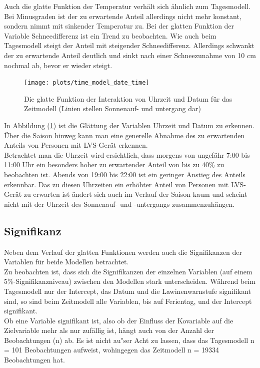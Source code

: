 \documentclass[12pt]{scrreprt}
\begin{document}
Auch die glatte Funktion der Temperatur verhält sich ähnlich zum Tagesmodell. Bei Minusgraden ist der zu erwartende Anteil allerdings nicht mehr konstant, sondern nimmt mit sinkender Temperatur zu. Bei der glatten Funktion der Variable Schneedifferenz ist ein Trend zu beobachten. Wie auch beim Tagesmodell steigt der Anteil mit steigender Schneedifferenz. Allerdings schwankt der zu erwartende Anteil deutlich und sinkt nach einer Schneezunahme von 10 cm nochmal ab, bevor er wieder steigt.
\begin{figure}[H]
	\centering
	\texttt{[image: plots/time\_model\_date\_time]}
	\caption{Die glatte Funktion der Interaktion von Uhrzeit und Datum für das Zeitmodell (Linien stellen Sonnenauf- und untergang dar)}
	\label{pic:time_model_date_time}	
\end{figure}
\noindent In Abbildung (\ref{pic:time_model_date_time}) ist die Glättung der Variablen Uhrzeit und Datum zu erkennen. Über die Saison hinweg kann man eine generelle Abnahme des zu erwartenden Anteils von Personen mit LVS-Gerät erkennen. \\
Betrachtet man die Uhrzeit wird ersichtlich, dass morgens von ungefähr 7:00 bis 11:00 Uhr ein besonders hoher zu erwartender Anteil von bis zu 40\% zu beobachten ist. Abends von 19:00 bis 22:00 ist ein geringer Anstieg des Anteils erkennbar. Das zu diesen Uhrzeiten ein erhöhter Anteil von Personen mit LVS-Gerät zu erwarten ist ändert sich auch im Verlauf der Saison kaum und scheint nicht mit der Uhrzeit des Sonnenauf- und -untergangs zusammenzuhängen.

\subsection{Signifikanz}
Neben dem Verlauf der glatten Funktionen werden auch die Signifikanzen der Variablen für beide Modellen betrachtet. \\
Zu beobachten ist, dass sich die Signifikanzen der einzelnen Variablen (auf einem 5\%-Signifikanzniveau) zwischen den Modellen stark unterscheiden. Während beim Tagesmodell nur der Intercept, das Datum und die Lawinenwarnstufe signifikant sind, so sind beim Zeitmodell alle Variablen, bis auf Ferientag, und der Intercept signifikant. \\
Ob eine Variable signifikant ist, also ob der Einfluss der Kovariable auf die Zielvariable mehr als nur zufällig ist, hängt auch von der Anzahl der Beobachtungen (n) ab. Es ist nicht au"ser Acht zu lassen, dass das Tagesmodell n = 101 Beobachtungen aufweist, wohingegen das Zeitmodell n = 19334 Beobachtungen hat.
\end{document}

